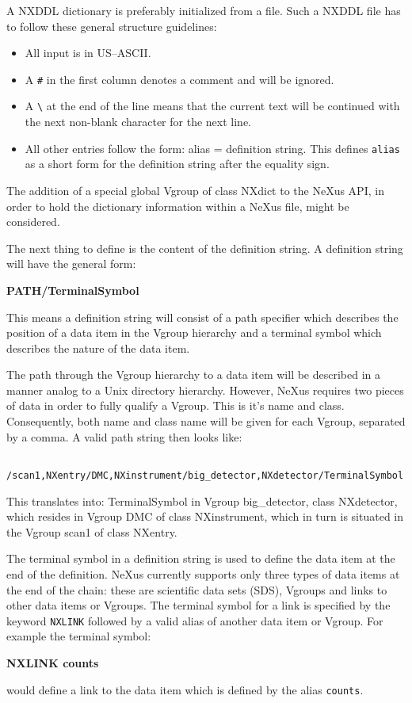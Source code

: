 \documentclass[12pt]{article}
\begin{document}
A NXDDL dictionary is preferably initialized from a file.
Such a NXDDL file has to follow these general structure guidelines:
\begin{itemize}
\item All input is in US--ASCII.
\item A \verb+#+ in the first column denotes a comment and will be ignored.
\item A \verb+\+ at the end of the line means that the current text will be 
 continued with the next non-blank character for the next line.
\item All other entries follow the form: alias = definition string.
 This defines \verb+alias+ as a short form for the definition string  after the
 equality sign.
\end{itemize}         
The addition of a special global Vgroup of class NXdict to the
NeXus API, in order to hold the dictionary information within a NeXus file, might be considered.

 The next thing to define is the content of the definition string. A
 definition string will have the general form: \\
\centerline{\bf PATH/TerminalSymbol}
 This means a definition string will consist of a path specifier which
 describes the position of a data item in the Vgroup hierarchy and a
 terminal symbol which describes the nature of the data item. 

 The path through the Vgroup hierarchy to a data item will be described in a
 manner analog to a Unix directory hierarchy. However, NeXus requires two
 pieces of data in order to fully qualify a Vgroup. This is it's name and
 class. Consequently, both name and class name will be given for each Vgroup,
 separated by a comma. A valid path string then looks like: \\
\begin{verbatim} 
     /scan1,NXentry/DMC,NXinstrument/big_detector,NXdetector/TerminalSymbol
\end{verbatim}
 This translates into: TerminalSymbol in Vgroup big\_detector, class
 NXdetector, which resides in Vgroup DMC of class NXinstrument, which in
 turn is situated in the Vgroup scan1 of class NXentry.

 The terminal symbol in a definition string is used to define the data item
 at the end of the definition. NeXus currently supports only three types of
 data items at the end of the chain: these are scientific data sets (SDS),
 Vgroups and links to other data items or Vgroups. The terminal symbol for a link
 is specified by the keyword \verb+NXLINK+  
 followed
 by a valid alias of another data item or Vgroup. For example the terminal 
 symbol: \\
 \centerline{\bf NXLINK counts}
 would define a link to the data item which is defined by the alias
 \verb+counts+.
\end{document}
